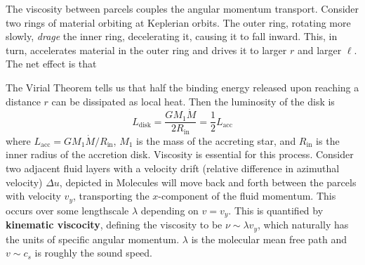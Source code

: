 \documentclass[10pt]{article}
\numberwithin{equation}{section}
\newcommand{\n}{\noindent}
\begin{document}
	\n The viscosity between parcels couples the angular momentum transport. Consider two rings of material orbiting at Keplerian orbits. The outer ring, rotating more slowly, \emph{drage} the inner ring, decelerating it, causing it to fall inward. This, in turn, accelerates material in the outer ring and drives it to larger $r$ and larger $\ell$. The net effect is that
	\begin{center}
	\end{center}
	The Virial Theorem tells us that half the binding energy released upon reaching a distance $r$ can be dissipated as local heat. Then the luminosity of the disk is 
	\begin{equation}
		\label{eq:disk:3} L_{\mathrm{disk}} = \frac{GM_1\dot{M}}{2R_{\mathrm{in}}} = \frac{1}{2} L_{\mathrm{acc}}
	\end{equation}
	where $L_{\mathrm{acc}} = G M_1\dot{M}/R_{\mathrm{in}}$, $M_1$ is the mass of the accreting star, and $R_{\mathrm{in}}$ is the inner radius of the accretion disk. Viscosity is essential for this process. Consider two adjacent fluid layers with a velocity drift (relative difference in azimuthal velocity) $\Delta u$, depicted in %
	Molecules will move back and forth between the parcels with velocity $v_y$, transporting the $x$-component of the fluid momentum. This occurs over some lengthscale $\lambda$ depending on $v=v_y$. This is quantified by \textbf{kinematic viscocity}, defining the viscosity to be $\nu\sim \lambda v_y$, which naturally has the units of specific angular momentum. $\lambda$ is the molecular mean free path and $v\sim c_s$ is roughly the sound speed.\\
	
\end{document}
